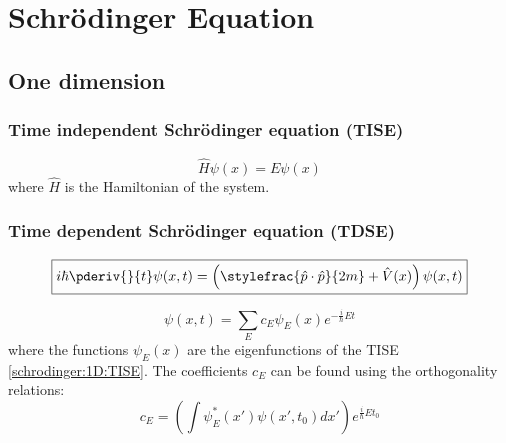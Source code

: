 \chapter{Schr\"odinger Equation}

\section{One dimension}
\subsection{Time independent Schr\"odinger equation (TISE)}

	\begin{formula}[TISE]
		\begin{equation}
			\label{schrodinger:1D:TISE}
		        \boxed{\hat{H}\psi(x) = E\psi(x)}
		\end{equation}
		where $\hat{H}$ is the Hamiltonian of the system.
	\end{formula}
    

\subsection{Time dependent Schr\"odinger equation (TDSE)}
	
	\begin{formula}
		\begin{equation}
			\label{schrodinger:1D:TDSE_position}
        		\boxed{i\hbar\pderiv{}{t}\psi(x, t) = \left(\stylefrac{\hat{p}\cdot\hat{p}}{2m} + \hat{V}(x)\right)\psi(x, t)}
		\end{equation}
	\end{formula}
	
	\begin{formula}
		\begin{equation}
			\label{schrodinger:1D:general_solution}
		        \boxed{\psi(x, t) = \sum_Ec_E\psi_E(x)e^{-\frac{i}{\hbar}Et}}
		\end{equation}
	        where the functions $\psi_E(x)$ are the eigenfunctions of the TISE \ref{schrodinger:1D:TISE}. The coefficients $c_E$ can be found using the orthogonality relations:
        	\begin{equation}
			\label{schrodinger:1D:general_solution_coefficients}
        		c_E=\left(\int\psi_E^*(x')\psi(x', t_0)dx'\right)e^{\frac{i}{\hbar}Et_0}
		\end{equation}
	\end{formula}
